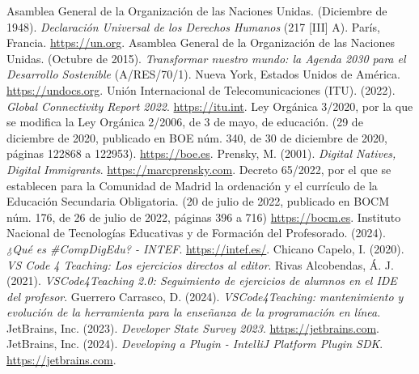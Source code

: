 \renewcommand{\bibname}{Bibliografía}
\begin{thebibliography}{99}
     Asamblea General de la Organización de las Naciones Unidas. (Diciembre de 1948). \textit{Declaración Universal de los Derechos Humanos} (217 [III] A). París, Francia. \href{https://www.un.org/es/about-us/universal-declaration-of-human-rights}{https://un.org}.
     Asamblea General de la Organización de las Naciones Unidas. (Octubre de 2015). \textit{Transformar nuestro mundo: la Agenda 2030 para el Desarrollo Sostenible} (A/RES/70/1). Nueva York, Estados Unidos de América. \href{https://undocs.org/es/A/RES/70/1}{https://undocs.org}.
     Unión Internacional de Telecomunicaciones (ITU). (2022). \textit{Global Connectivity Report 2022}. \href{https://www.itu.int/hub/publication/d-ind-global-01-2022/}{https://itu.int}.
     Ley Orgánica 3/2020, por la que se modifica la Ley Orgánica 2/2006, de 3 de mayo, de educación. (29 de diciembre de 2020, publicado en BOE núm. 340, de 30 de diciembre de 2020, páginas 122868 a 122953). \href{https://www.boe.es/eli/es/lo/2020/12/29/3/}{https://boe.es}.
     Prensky, M. (2001). \textit{Digital Natives, Digital Immigrants}. \href{https://www.marcprensky.com/writing/Prensky%20-%20Digital%20Natives,%20Digital%20Immigrants%20-%20Part1.pdf}{https://marcprensky.com}.
     Decreto 65/2022, por el que se establecen para la Comunidad de Madrid la ordenación y el currículo de la Educación Secundaria Obligatoria. (20 de julio de 2022, publicado en BOCM núm. 176, de 26 de julio de 2022, páginas 396 a 716) \href{https://www.bocm.es/boletin/CM_Orden_BOCM/2022/07/26/BOCM-20220726-2.PDF}{https://bocm.es}.
     Instituto Nacional de Tecnologías Educativas y de Formación del Profesorado. (2024). \textit{¿Qué es \#CompDigEdu? - INTEF}. \href{https://intef.es/competencia-digital-educativa/compdigedu/}{https://intef.es/}.
     Chicano Capelo, I. (2020). \textit{VS Code 4 Teaching: Los ejercicios directos al editor}.
     Rivas Alcobendas, Á. J. (2021). \textit{VSCode4Teaching 2.0: Seguimiento de ejercicios de alumnos en el IDE del profesor}.
     Guerrero Carrasco, D. (2024). \textit{VSCode4Teaching: mantenimiento y evolución de la herramienta para la enseñanza de la programación en línea}.
     JetBrains, Inc. (2023). \textit{Developer State Survey 2023}. \href{https://www.jetbrains.com/lp/devecosystem-2023/}{https://jetbrains.com}.
     JetBrains, Inc. (2024). \textit{Developing a Plugin - IntelliJ Platform Plugin SDK}. \href{https://plugins.jetbrains.com/docs/intellij/developing-plugins.html}{https://jetbrains.com}.


\end{thebibliography}
